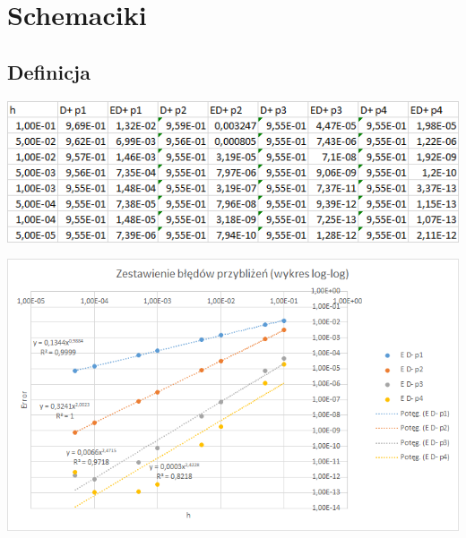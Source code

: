 \section{Schemaciki}
\subsection{Definicja}

\includegraphics{Lab2/charts/rz1_log_Db_dane.png}

\includegraphics{Lab2/charts/rz1_log_Db.png}
